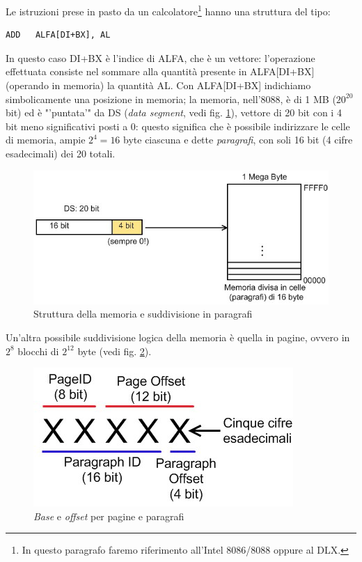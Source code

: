 Le istruzioni prese in pasto da un calcolatore\footnote{In questo paragrafo faremo riferimento all'Intel 8086/8088 oppure al DLX.} hanno una struttura del tipo:
\begin{verbatim}
ADD   ALFA[DI+BX], AL
\end{verbatim}
In questo caso DI+BX è l'indice di ALFA, che è un vettore: l'operazione effettuata consiste nel sommare alla quantità presente in ALFA[DI+BX] (operando in memoria) la quantità AL. Con ALFA[DI+BX] indichiamo simbolicamente una posizione in memoria; la memoria, nell'8088, è di 1 MB ($20^{20}$ bit) ed è "'puntata'" da DS (\textit{data segment}, vedi fig. \ref{fig:DSmemoria}), vettore di 20 bit con i 4 bit meno significativi posti a 0: questo significa che è possibile indirizzare le celle di memoria, ampie $2^4 = 16$ byte ciascuna e dette \textit{paragrafi}, con soli 16 bit (4 cifre esadecimali) dei 20 totali.
\begin{figure}[!h]
\centering
\includegraphics[width=0.7\columnwidth]{img/DSmemoria}
\caption{Struttura della memoria e suddivisione in paragrafi}
\label{fig:DSmemoria}
\end{figure}

Un'altra possibile suddivisione logica della memoria è quella in pagine, ovvero in $2^8$ blocchi di $2^{12}$ byte (vedi fig. \ref{fig:pagineParagrafi}).

\begin{figure}[!h]
\centering
\includegraphics[width=0.4\columnwidth]{img/pagineParagrafi}
\caption{\textit{Base} e \textit{offset} per pagine e paragrafi}
\label{fig:pagineParagrafi}
\end{figure}

